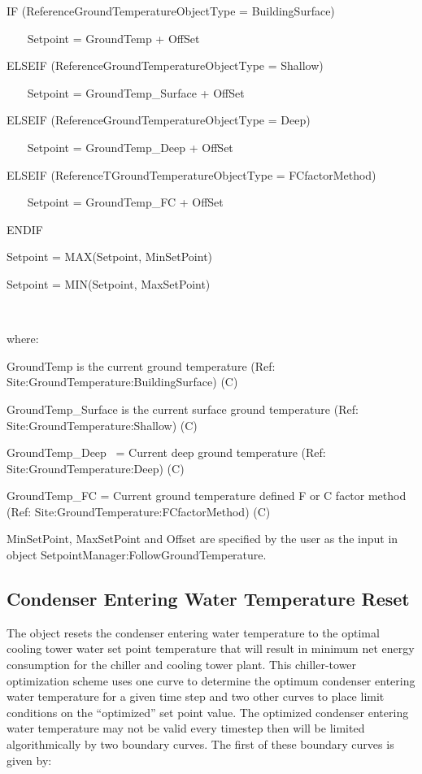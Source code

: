 IF (ReferenceGroundTemperatureObjectType = BuildingSurface)

~~~ Setpoint = GroundTemp + OffSet

ELSEIF (ReferenceGroundTemperatureObjectType = Shallow)

~~~ Setpoint = GroundTemp\_Surface + OffSet

ELSEIF (ReferenceGroundTemperatureObjectType = Deep)

~~~ Setpoint = GroundTemp\_Deep + OffSet

ELSEIF (ReferenceTGroundTemperatureObjectType = FCfactorMethod)

~~~ Setpoint = GroundTemp\_FC + OffSet

ENDIF

Setpoint = MAX(Setpoint, MinSetPoint)

Setpoint = MIN(Setpoint, MaxSetPoint)

\emph{~}

where:

GroundTemp is the current ground temperature (Ref: Site:GroundTemperature:BuildingSurface) (C)

GroundTemp\_Surface is the current surface ground temperature (Ref: Site:GroundTemperature:Shallow) (C)

GroundTemp\_Deep~ = Current deep ground temperature (Ref: Site:GroundTemperature:Deep) (C)

GroundTemp\_FC = Current ground temperature defined F or C factor method (Ref: Site:GroundTemperature:FCfactorMethod) (C)

MinSetPoint, MaxSetPoint and Offset are specified by the user as the input in object SetpointManager:FollowGroundTemperature.

\subsection{Condenser Entering Water Temperature Reset}\label{condenser-entering-water-temperature-reset}

The object resets the condenser entering water temperature to the optimal cooling tower water set point temperature that will result in minimum net energy consumption for the chiller and cooling tower plant. This chiller-tower optimization scheme uses one curve to determine the optimum condenser entering water temperature for a given time step and two other curves to place limit conditions on the ``optimized'' set point value. The optimized condenser entering water temperature may not be valid every timestep then will be limited algorithmically by two boundary curves. The first of these boundary curves is given by:

